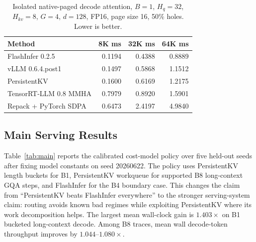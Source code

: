\documentclass[10pt]{article}
\begin{document}
\begin{table}[t]
\centering
\caption{Isolated native-paged decode attention, $B=1$, $H_q=32$,
$H_{kv}=8$, $G=4$, $d=128$, FP16, page size 16, 50\% holes. Lower is better.}
\label{tab:native}
\small
\begin{tabular}{lrrr}
\toprule
Method & 8K ms & 32K ms & 64K ms \\
\midrule
FlashInfer 0.2.5 & 0.1194 & 0.4388 & 0.8889 \\
vLLM 0.6.4.post1 & 0.1497 & 0.5868 & 1.1512 \\
PersistentKV & 0.1600 & 0.6169 & 1.2175 \\
TensorRT-LLM 0.8 MMHA & 0.7979 & 0.8920 & 1.5901 \\
Repack + PyTorch SDPA & 0.6473 & 2.4197 & 4.9840 \\
\bottomrule
\end{tabular}
\end{table}

\subsection{Main Serving Results}

Table~\ref{tab:main} reports the calibrated cost-model policy over five
held-out seeds after fixing model constants on seed 20260622. The policy uses
PersistentKV length buckets for B1, PersistentKV workqueue for supported B8
long-context GQA steps, and FlashInfer for the B4 boundary case. This changes the
claim from ``PersistentKV beats FlashInfer everywhere'' to the stronger
serving-system claim: routing avoids known bad regimes while exploiting
PersistentKV where its work decomposition helps. The largest mean wall-clock
gain is $1.403\times$ on B1 bucketed long-context decode. Among B8 traces, mean
wall decode-token throughput improves by $1.044$--$1.080\times$.
\end{document}
